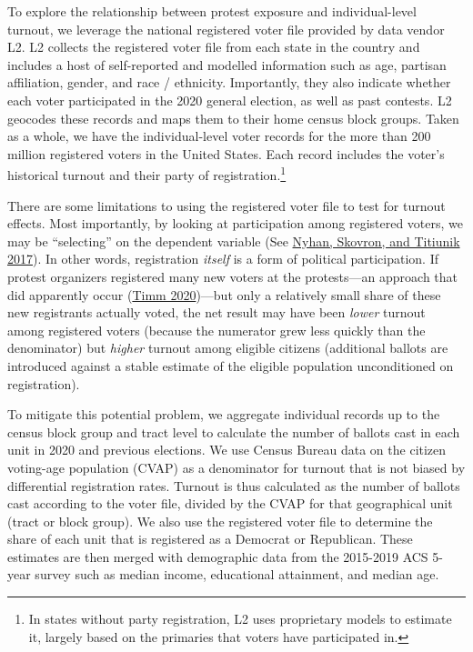 \documentclass[
  12pt,
]{article}
\begin{document}
To explore the relationship between protest exposure and individual-level turnout, we leverage the national registered voter file provided by data vendor L2. L2 collects the registered voter file from each state in the country and includes a host of self-reported and modelled information such as age, partisan affiliation, gender, and race / ethnicity. Importantly, they also indicate whether each voter participated in the 2020 general election, as well as past contests. L2 geocodes these records and maps them to their home census block groups. Taken as a whole, we have the individual-level voter records for the more than 200 million registered voters in the United States. Each record includes the voter's historical turnout and their party of registration.\footnote{In states without party registration, L2 uses proprietary models to estimate it, largely based on the primaries that voters have participated in.}

There are some limitations to using the registered voter file to test for turnout effects. Most importantly, by looking at participation among registered voters, we may be ``selecting'' on the dependent variable (See \protect\hyperlink{ref-Nyhan2017}{Nyhan, Skovron, and Titiunik 2017}). In other words, registration \emph{itself} is a form of political participation. If protest organizers registered many new voters at the protests---an approach that did apparently occur (\protect\hyperlink{ref-Timm2020}{Timm 2020})---but only a relatively small share of these new registrants actually voted, the net result may have been \emph{lower} turnout among registered voters (because the numerator grew less quickly than the denominator) but \emph{higher} turnout among eligible citizens (additional ballots are introduced against a stable estimate of the eligible population unconditioned on registration).

To mitigate this potential problem, we aggregate individual records up to the census block group and tract level to calculate the number of ballots cast in each unit in 2020 and previous elections. We use Census Bureau data on the citizen voting-age population (CVAP) as a denominator for turnout that is not biased by differential registration rates. Turnout is thus calculated as the number of ballots cast according to the voter file, divided by the CVAP for that geographical unit (tract or block group). We also use the registered voter file to determine the share of each unit that is registered as a Democrat or Republican. These estimates are then merged with demographic data from the 2015-2019 ACS 5-year survey such as median income, educational attainment, and median age.
\end{document}
